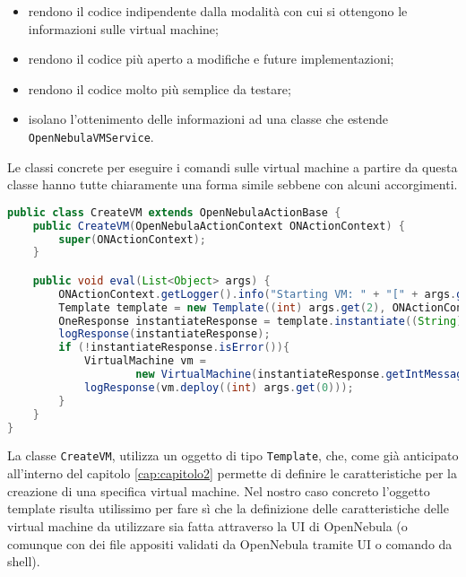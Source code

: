 \begin{itemize}
    \item rendono il codice indipendente dalla modalità con cui si ottengono le informazioni sulle virtual machine;
    \item rendono il codice più aperto a modifiche e future implementazioni;
    \item rendono il codice molto più semplice da testare;
    \item isolano l'ottenimento delle informazioni ad una classe che estende \texttt{OpenNebulaVMService}.
\end{itemize}
Le classi concrete per eseguire i comandi sulle virtual machine a partire da questa classe hanno tutte chiaramente una forma simile sebbene con alcuni accorgimenti.
\begin{lstlisting}[language=Java, caption=Classe per avviare una \texttt{VirtualMachine}, label=code:CreateVM, basicstyle=\fontsize{8.5}{9.5}\ttfamily]
public class CreateVM extends OpenNebulaActionBase {
	public CreateVM(OpenNebulaActionContext ONActionContext) {
		super(ONActionContext);
	}

	public void eval(List<Object> args) {
		ONActionContext.getLogger().info("Starting VM: " + "[" + args.get(2) + ", " + args.get(1) + "]");
		Template template = new Template((int) args.get(2), ONActionContext.getClient());
		OneResponse instantiateResponse = template.instantiate((String) args.get(1));
		logResponse(instantiateResponse);
		if (!instantiateResponse.isError()){
			VirtualMachine vm = 
					new VirtualMachine(instantiateResponse.getIntMessage(), ONActionContext.getClient());
			logResponse(vm.deploy((int) args.get(0)));
		}		
	}
}
\end{lstlisting}
La classe \texttt{CreateVM}, utilizza un oggetto di tipo \texttt{Template}, che, come già anticipato all'interno del capitolo \ref{cap:capitolo2} permette di definire le caratteristiche per la creazione di una specifica virtual machine. Nel nostro caso concreto l'oggetto template risulta utilissimo per fare sì che la definizione delle caratteristiche delle virtual machine da utilizzare sia fatta attraverso la UI di OpenNebula (o comunque con dei file appositi validati da OpenNebula tramite UI o comando da shell).\par

